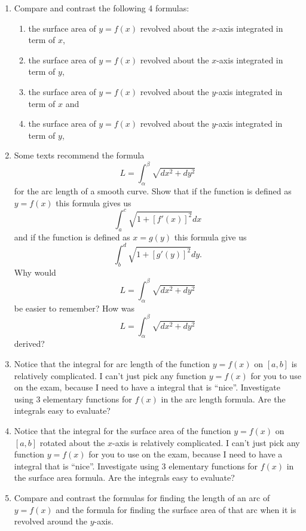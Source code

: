 \begin{enumerate}
\item Compare and contrast the following 4 formulas:  
\begin{enumerate}
\item  the surface area of $y = f(x)$ revolved about the $x$-axis integrated in term of $x$,
\item  the surface area of $y = f(x)$ revolved about the $x$-axis integrated in term of $y$,
\item  the surface area of $y = f(x)$ revolved about the $y$-axis integrated in term of $x$ and
\item  the surface area of $y = f(x)$ revolved about the $y$-axis integrated in term of $y$,
\end{enumerate} 

\item  Some texts recommend the formula $$L = \int_\alpha ^\beta  {\sqrt {dx^2  + dy^2 } } $$ for the arc length of a smooth curve.  Show that if the function is defined as $y = f(x)$ this formula gives us $$\int_a^c {\sqrt {1 + \left[ {f'\left( x \right)} \right]^2 } dx} $$ and if the function is defined as $x = g(y)$ this formula give us $$\int_b^d {\sqrt {1 + \left[ {g'\left( y \right)} \right]^2 } dy} .$$  Why would $$L = \int_\alpha ^\beta  {\sqrt {dx^2  + dy^2 } } $$ be easier to remember?  How was $$L = \int_\alpha ^\beta  {\sqrt {dx^2  + dy^2 } } $$ derived?

\item  Notice that the integral for arc length of the function $y = f(x)$ on $[a, b]$ is relatively complicated.  I can't just pick any function $y = f(x)$ for you to use on the exam, because I need to have a integral that is ``nice''.  Investigate using 3 elementary functions for $f(x)$ in the arc length formula.  Are the integrals easy to evaluate?

\item  Notice that the integral for the surface area of the function $y = f(x)$ on $[a, b]$ rotated about the $x$-axis is relatively complicated.  I can't just pick any function $y = f(x)$ for you to use on the exam, because I need to have a integral that is ``nice''.  Investigate using 3 elementary functions for $f(x)$ in the surface area formula.  Are the integrals easy to evaluate?

\item  Compare and contrast the formulas for finding the length of an arc of $y = f(x)$ and the formula for finding the surface area of that arc when it is revolved around the $y$-axis.

\end{enumerate}


